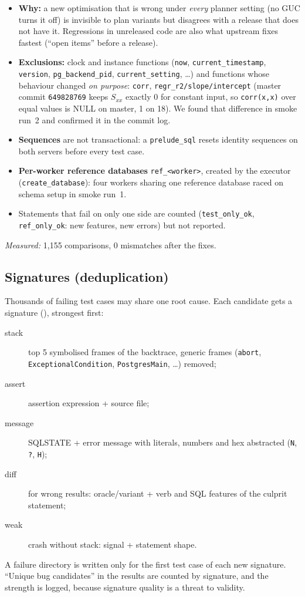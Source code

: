 \begin{itemize}
  \item \textbf{Why:} a new optimisation that is wrong under \emph{every}
    planner setting (no GUC turns it off) is invisible to plan variants but
    disagrees with a release that does not have it. Regressions in unreleased
    code are also what upstream fixes fastest (``open items'' before a
    release).
  \item \textbf{Exclusions:} clock and instance functions (\texttt{now},
    \texttt{current\_timestamp}, \texttt{version}, \texttt{pg\_backend\_pid},
    \texttt{current\_setting}, \dots) and functions whose behaviour changed
    \emph{on purpose}: \texttt{corr}, \texttt{regr\_r2/slope/intercept}
    (master commit \texttt{649828769} keeps $S_{xx}$ exactly 0 for constant
    input, so \texttt{corr(x,x)} over equal values is NULL on master, 1 on 18).
    We found that difference in smoke run~2 and confirmed it in the commit log.
  \item \textbf{Sequences} are not transactional: a \texttt{prelude\_sql}
    resets identity sequences on both servers before every test case.
  \item \textbf{Per-worker reference databases} \texttt{ref\_<worker>}, created
    by the executor (\texttt{create\_database}): four workers sharing one
    reference database raced on schema setup in smoke run~1.
  \item Statements that fail on only one side are counted
    (\texttt{test\_only\_ok}, \texttt{ref\_only\_ok}: new features, new errors)
    but not reported.
\end{itemize}
\emph{Measured:} 1{,}155 comparisons, 0 mismatches after the fixes.

\subsection{Signatures (deduplication)}
\label{sec:signatures}

Thousands of failing test cases may share one root cause. Each candidate gets
a signature (), strongest first:
\begin{description}
  \item[stack] top 5 symbolised frames of the backtrace, generic frames
    (\texttt{abort}, \texttt{ExceptionalCondition}, \texttt{PostgresMain},
    \dots) removed;
  \item[assert] assertion expression + source file;
  \item[message] SQLSTATE + error message with literals, numbers and hex
    abstracted (\texttt{N}, \texttt{?}, \texttt{H});
  \item[diff] for wrong results: oracle/variant + verb and SQL features of the
    culprit statement;
  \item[weak] crash without stack: signal + statement shape.
\end{description}
A failure directory is written only for the first test case of each new
signature. ``Unique bug candidates'' in the results are counted by signature,
and the strength is logged, because signature quality is a threat to validity.
